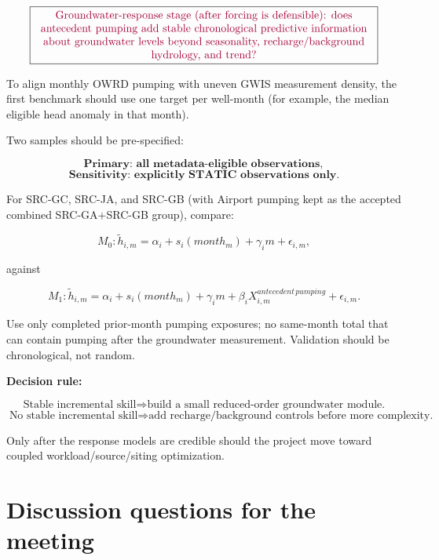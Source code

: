 \documentclass[11pt]{article}
\newcommand{\latesttxt}[1]{\textcolor{purple!85!black}{#1}}
\begin{document}
\[
\boxed{\parbox{0.90\linewidth}{\centering
\latesttxt{Groundwater-response stage (after forcing is defensible): does antecedent pumping add stable chronological predictive information about groundwater levels beyond seasonality, recharge/background hydrology, and trend?}}}
\]

To align monthly OWRD pumping with uneven GWIS measurement density, the first benchmark should use one target per well-month (for example, the median eligible head anomaly in that month).

Two samples should be pre-specified:

\[
\textbf{Primary: all metadata-eligible observations},
\]
\[
\textbf{Sensitivity: explicitly STATIC observations only}.
\]

For SRC-GC, SRC-JA, and SRC-GB (with Airport pumping kept as the accepted combined SRC-GA+SRC-GB group), compare:

\[
M_0:
\tilde h_{i,m}
=
\alpha_i+s_i(month_m)+\gamma_i m+\epsilon_{i,m},
\]

against

\[
M_1:
\tilde h_{i,m}
=
\alpha_i+s_i(month_m)+\gamma_i m+\beta_iX^{antecedent\,pumping}_{i,m}+\epsilon_{i,m}.
\]

Use only completed prior-month pumping exposures; no same-month total that can contain pumping after the groundwater measurement. Validation should be chronological, not random.

\textbf{Decision rule:}

\[
\boxed{\text{Stable incremental skill} \Rightarrow \text{build a small reduced-order groundwater module.}}
\]
\[
\boxed{\text{No stable incremental skill} \Rightarrow \text{add recharge/background controls before more complexity.}}
\]

Only after the response models are credible should the project move toward coupled workload/source/siting optimization.


\section{Discussion questions for the meeting}
\end{document}
